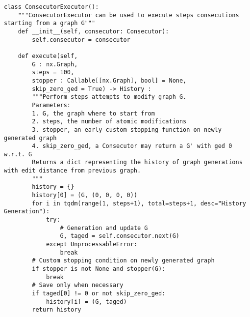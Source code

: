 \begin{lstlisting}[label={code:consecutor_executor}, caption={Consecutor Executor}]
class ConsecutorExecutor():
	"""ConsecutorExecutor can be used to execute steps consecutions starting from a graph G"""
	def __init__(self, consecutor: Consecutor):
		self.consecutor = consecutor
	
	def execute(self, 
		G : nx.Graph, 
		steps = 100, 
		stopper : Callable[[nx.Graph], bool] = None, 
		skip_zero_ged = True) -> History :
		"""Perform steps attempts to modify graph G.
		Parameters:
		1. G, the graph where to start from
		2. steps, the number of atomic modifications
		3. stopper, an early custom stopping function on newly generated graph
		4. skip_zero_ged, a Consecutor may return a G' with ged 0 w.r.t. G
		Returns a dict representing the history of graph generations with edit distance from previous graph.
		"""
		history = {}
		history[0] = (G, (0, 0, 0, 0))
		for i in tqdm(range(1, steps+1), total=steps+1, desc="History Generation"):
			try:
				# Generation and update G
				G, taged = self.consecutor.next(G)
			except UnprocessableError:
				break
		# Custom stopping condition on newly generated graph
		if stopper is not None and stopper(G):
			break
		# Save only when necessary
		if taged[0] != 0 or not skip_zero_ged:
			history[i] = (G, taged)
		return history	
\end{lstlisting}